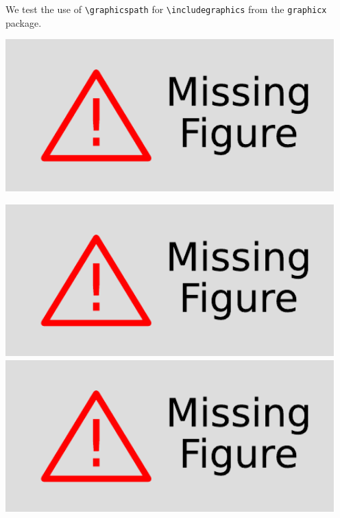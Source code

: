 \documentclass{article}
\begin{document}
We test the use of \verb|\graphicspath| for \verb|\includegraphics| from the \verb|graphicx| package.

\includegraphics[width=5in]{images/pdf/missingfig.pdf}

\graphicspath{
  {images/}
}

\includegraphics[width=5in]{images/pdf/missingfig.pdf}
\includegraphics[width=5in]{pdf/missingfig.pdf}

\graphicspath{
  {images/pdf/}
}
\end{document}
